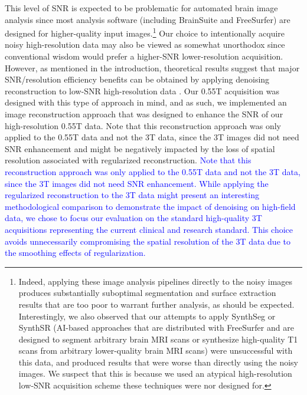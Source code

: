\documentclass[12pt,letterpaper,onecolumn]{article}
\newcommand{\mycomment}[1]
{\todo[caption={#1},color=red!100!green!33,noline]{\color{black} \begin{spacing}{0.5}#1\vspace{-0.5em}\end{spacing}}}
\begin{document}
This level of SNR is expected to be problematic for automated brain image analysis since most analysis software (including BrainSuite and FreeSurfer) are designed for higher-quality input images.\footnote{\color{.}Indeed, applying these image analysis pipelines directly to the noisy images produces substantially suboptimal segmentation and surface extraction results that are too poor to warrant further analysis, as should be expected. Interestingly, we also observed that our attempts to apply SynthSeg or SynthSR \cite{billot2023synthseg, iglesias2023synthsr} (AI-based approaches that are distributed with FreeSurfer and are designed to segment arbitrary brain MRI scans or synthesize high-quality T1 scans from arbitrary lower-quality brain MRI scans) were unsuccessful with this data, and produced results that were worse than directly using the noisy images. We suspect that this is because we used an atypical high-resolution low-SNR acquisition scheme these techniques were nor designed for. } Our choice to intentionally acquire noisy high-resolution data may also be viewed as somewhat unorthodox since conventional wisdom would prefer a higher-SNR lower-resolution acquisition\cite{haldar2022}.  However, as mentioned in the introduction,  theoretical results suggest that major SNR/resolution efficiency benefits can be obtained by applying denoising reconstruction to low-SNR high-resolution data \cite{haldar2008, haldar2011a, haldar2011c, haldar2013}. {\color{.} Our 0.55T acquisition was designed with this type of approach in mind, and as such, we implemented an image reconstruction approach that was designed to enhance the SNR of our high-resolution 0.55T data.} {\color{.} Note that this reconstruction approach was only applied to the 0.55T data and not the 3T data, since the 3T images did not need SNR enhancement and might be negatively impacted by the loss of spatial resolution associated with regularized reconstruction. }
 \textcolor{blue}{Note that this reconstruction approach was only applied to the 0.55T data and not the 3T data, since the 3T images did not need SNR enhancement. While applying the regularized reconstruction to the 3T data might present an interesting methodological comparison to demonstrate the impact of denoising on high-field data, we chose to focus our evaluation on the standard high-quality 3T acquisitions representing the current clinical and research standard. This choice avoids unnecessarily compromising the spatial resolution of the 3T data due to the smoothing effects of regularization.\mycomment{R1.1}}
\end{document}
